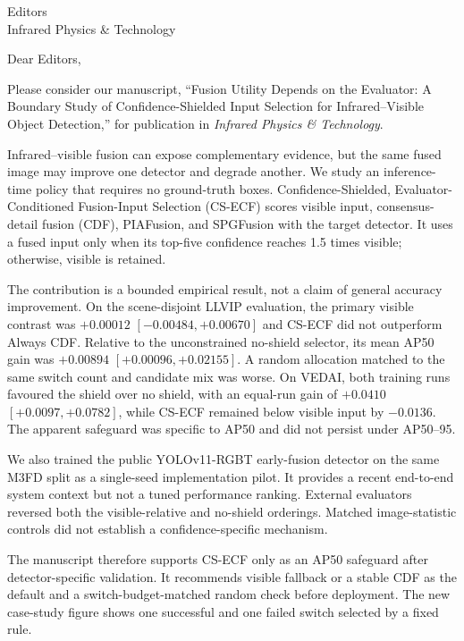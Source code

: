 \documentclass[a4paper,10pt]{letter}
\begin{document}
\sloppy
\begin{letter}{Editors\\Infrared Physics \& Technology}
\opening{Dear Editors,}

Please consider our manuscript, ``Fusion Utility Depends on the Evaluator:
A Boundary Study of Confidence-Shielded Input Selection for Infrared--Visible Object Detection,'' for
publication in \emph{Infrared Physics \& Technology}.

Infrared--visible fusion can expose complementary evidence, but the same fused
image may improve one detector and degrade another. We study an inference-time
policy that requires no ground-truth boxes. Confidence-Shielded,
Evaluator-Conditioned Fusion-Input Selection (CS-ECF) scores visible input,
consensus-detail fusion (CDF), PIAFusion, and SPGFusion with the target
detector. It uses a fused input only when its top-five confidence reaches 1.5
times visible; otherwise, visible is retained.

The contribution is a bounded empirical result, not a claim of general
accuracy improvement. On the scene-disjoint LLVIP evaluation, the primary
visible contrast was \(+0.00012\) \([-0.00484,+0.00670]\) and CS-ECF did not
outperform Always CDF. Relative to the unconstrained no-shield selector, its
mean AP50 gain was \(+0.00894\) \([+0.00096,+0.02155]\). A random allocation
matched to the same switch count and candidate mix was worse. On VEDAI,
both training runs favoured the shield over no shield, with an equal-run gain
of \(+0.0410\) \([+0.0097,+0.0782]\), while CS-ECF remained below visible
input by \(-0.0136\). The apparent safeguard was specific to AP50 and did not
persist under AP50--95.

We also trained the public YOLOv11-RGBT early-fusion detector on the same M3FD
split as a single-seed implementation pilot. It provides a recent end-to-end
system context but not a tuned performance ranking. External evaluators
reversed both the visible-relative and no-shield orderings. Matched
image-statistic controls did not establish a confidence-specific mechanism.

The manuscript therefore supports CS-ECF only as an AP50 safeguard after
detector-specific validation. It recommends visible fallback or a stable CDF
as the default and a switch-budget-matched random check before deployment.
The new case-study figure shows one successful and one failed switch selected
by a fixed rule.


\end{letter}
\end{document}
